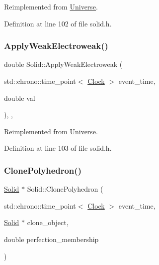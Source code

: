 Reimplemented from \hyperlink{class_universe_a6d1226b3adec3c42a833afdbb6a65a92}{Universe}.



Definition at line 102 of file solid.\+h.

\mbox{\label{class_solid_ad6c28ec896cbcf64e24a7132a144befd}} 
\subsubsection{\texorpdfstring{Apply\+Weak\+Electroweak()}{ApplyWeakElectroweak()}}
{\footnotesize\ttfamily double Solid\+::\+Apply\+Weak\+Electroweak (\begin{DoxyParamCaption}\item[{std\+::chrono\+::time\+\_\+point$<$ \hyperlink{universe_8h_a0ef8d951d1ca5ab3cfaf7ab4c7a6fd80}{Clock} $>$}]{event\+\_\+time,  }\item[{double}]{val }\end{DoxyParamCaption})\hspace{0.3cm}{\ttfamily [inline]}, {\ttfamily [final]}, {\ttfamily [virtual]}}



Reimplemented from \hyperlink{class_universe_a46a906baabb63e5d31f8b48ea1fae52e}{Universe}.



Definition at line 103 of file solid.\+h.

\mbox{\label{class_solid_ae83094e9c002a7574db242ed0bff6288}} 
\subsubsection{\texorpdfstring{Clone\+Polyhedron()}{ClonePolyhedron()}}
{\footnotesize\ttfamily \hyperlink{class_solid}{Solid} $\ast$ Solid\+::\+Clone\+Polyhedron (\begin{DoxyParamCaption}\item[{std\+::chrono\+::time\+\_\+point$<$ \hyperlink{universe_8h_a0ef8d951d1ca5ab3cfaf7ab4c7a6fd80}{Clock} $>$}]{event\+\_\+time,  }\item[{\hyperlink{class_solid}{Solid} $\ast$}]{clone\+\_\+object,  }\item[{double}]{perfection\+\_\+membership }\end{DoxyParamCaption})}



